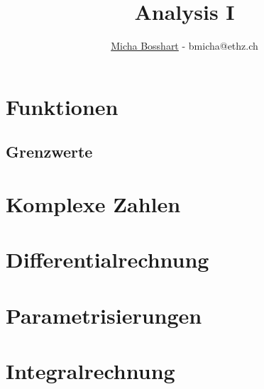 \documentclass[8pt]{mpscheatsheet}
\author{\href{https://n.ethz.ch/\~bmicha}{Micha Bosshart} - bmicha@ethz.ch}
\title{Analysis I}
\begin{document}
    \section{Funktionen}
        
        \subsection{Grenzwerte}
        
        
        
        
        
    \section{Komplexe Zahlen}
        
        
    \section{Differentialrechnung}
        
        
        
        
        
        \vfill \null \columnbreak
    \section{Parametrisierungen}
        
    \section{Integralrechnung}
        
        
        
        
        
        
        
        
        
\end{document}
